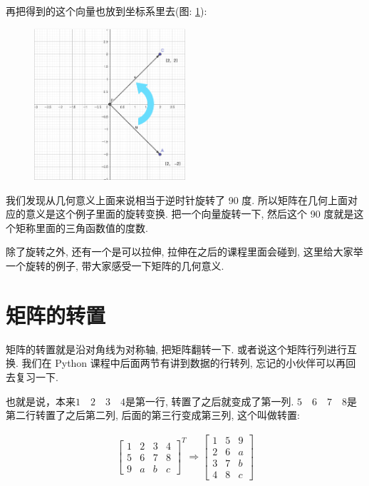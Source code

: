 再把得到的这个向量也放到坐标系里去(图: \ref{fig:img4_2}):

\begin{figure}[ht]
  \centering
  \caption{}
  \label{fig:img4_2}
  \includegraphics[width=0.5\textwidth]{asset/20230825225602.png}
\end{figure}

我们发现从几何意义上面来说相当于逆时针旋转了 90 度. 所以矩阵在几何上面对应的意义是这个例子里面的旋转变换. 把一个向量旋转一下, 然后这个 90 度就是这个矩称里面的三角函数值的度数. 

除了旋转之外, 还有一个是可以拉伸, 拉伸在之后的课程里面会碰到, 这里给大家举一个旋转的例子, 带大家感受一下矩阵的几何意义. 

\section{矩阵的转置}

矩阵的转置就是沿对角线为对称轴, 把矩阵翻转一下. 或者说这个矩阵行列进行互换. 我们在 Python 课程中后面两节有讲到数据的行转列, 忘记的小伙伴可以再回去复习一下. 

也就是说，本来$1 \quad 2 \quad 3 \quad 4$是第一行, 转置了之后就变成了第一列. $5 \quad 6 \quad 7 \quad 8$是第二行转置了之后第二列, 后面的第三行变成第三列, 这个叫做转置:

\begin{align*}
  \begin{bmatrix} 1 & 2 & 3 & 4 \\ 5 & 6 & 7 & 8 \\ 9 & a & b & c \end{bmatrix}^T
  \Rightarrow \begin{bmatrix} 1 & 5 & 9 \\ 2 & 6 & a \\ 3 & 7 & b \\ 4 & 8 & c \end{bmatrix}
\end{align*}

